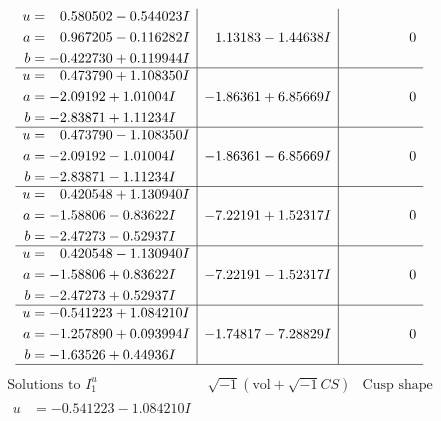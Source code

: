 \documentclass[1p]{elsarticle_modified}
\theoremstyle{definition}
\newcommand{\I}{\sqrt{-1}}
\begin{document}
$$\begin{array}{c|c|c}
\begin{aligned}
u &= \phantom{-}0.580502 - 0.544023 I \\
a &= \phantom{-}0.967205 - 0.116282 I \\
b &= -0.422730 + 0.119944 I\end{aligned}
 & \phantom{-}1.13183 - 1.44638 I & \phantom{-0.000000 } 0 \\ \hline\begin{aligned}
u &= \phantom{-}0.473790 + 1.108350 I \\
a &= -2.09192 + 1.01004 I \\
b &= -2.83871 + 1.11234 I\end{aligned}
 & -1.86361 + 6.85669 I & \phantom{-0.000000 } 0 \\ \hline\begin{aligned}
u &= \phantom{-}0.473790 - 1.108350 I \\
a &= -2.09192 - 1.01004 I \\
b &= -2.83871 - 1.11234 I\end{aligned}
 & -1.86361 - 6.85669 I & \phantom{-0.000000 } 0 \\ \hline\begin{aligned}
u &= \phantom{-}0.420548 + 1.130940 I \\
a &= -1.58806 - 0.83622 I \\
b &= -2.47273 - 0.52937 I\end{aligned}
 & -7.22191 + 1.52317 I & \phantom{-0.000000 } 0 \\ \hline\begin{aligned}
u &= \phantom{-}0.420548 - 1.130940 I \\
a &= -1.58806 + 0.83622 I \\
b &= -2.47273 + 0.52937 I\end{aligned}
 & -7.22191 - 1.52317 I & \phantom{-0.000000 } 0 \\ \hline\begin{aligned}
u &= -0.541223 + 1.084210 I \\
a &= -1.257890 + 0.093994 I \\
b &= -1.63526 + 0.44936 I\end{aligned}
 & -1.74817 - 7.28829 I & \phantom{-0.000000 } 0\\
 \hline 
 \end{array}$$\newpage$$\begin{array}{c|c|c}  
\text{Solutions to }I^u_{1}& \I (\text{vol} + \sqrt{-1}CS) & \text{Cusp shape}\\
 \hline 
\begin{aligned}
u &= -0.541223 - 1.084210 I \\

\end{aligned}
\end{array}$$
\end{document}

